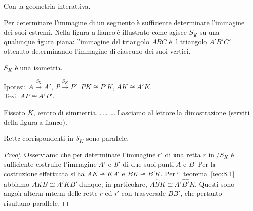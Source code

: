Con la geometria interattiva.


\noindent\begin{minipage}{0.65\textwidth}\parindent15pt
Per determinare l'immagine di un segmento è sufficiente determinare 
l'immagine dei suoi estremi. Nella figura a fianco è illustrato come 
agisce \(S_K\) su una qualunque figura piana: l'immagine del triangolo 
\(ABC\) è il triangolo \(A'B'C'\) ottenuto determinando l'immagine di 
ciascuno dei suoi vertici.
\end{minipage}\hfil
\begin{minipage}{0.35\textwidth}
  \centering
\end{minipage}

\begin{teorema}\label{teo:8.1}
\(S_K\) è una isometria.
\end{teorema}

\noindent\begin{minipage}{0.65\textwidth}\parindent15pt
\noindent Ipotesi: \(A\overset{S_K}{\rightarrow}A'\), 
\(P\overset{S_K}{\rightarrow}P'\), \(PK\cong P'K\), \(AK\cong A'K\).\\
Tesi: \(AP\cong A'P'\).

Fissato \(K\), centro di simmetria, \ldots\ldots\ldots{}.
Lasciamo al lettore la dimostrazione (serviti della figura a fianco).
\end{minipage}\hfil
\begin{minipage}{0.35\textwidth}
  \centering
\end{minipage}

\begin{teorema}\label{teo:8.2}
Rette corrispondenti in \(S_K\) sono parallele.
\end{teorema}

\noindent\begin{minipage}{0.65\textwidth}\parindent15pt
\begin{proof}
Osserviamo che per determinare l'immagine \(r'\) di una retta \(r\) in 
/\(S_K\) è sufficiente costruire l'immagine \(A'\) e \(B'\) di due suoi 
punti \(A\) e \(B\). Per la costruzione effettuata si ha \(AK\cong KA'\) e 
\(BK\cong B'K\). Per il teorema~\ref{teo:8.1} abbiamo \(AKB\cong A'KB'\) 
dunque, in particolare, \(A\widehat{B}K\cong A'\widehat{B'}K\). Questi 
sono angoli alterni interni delle rette \(r\) ed \(r'\) con trasversale 
\(BB'\), che pertanto risultano parallele.
\end{proof}
\end{minipage}\hfil
\begin{minipage}{0.35\textwidth}
  
\centering
\end{minipage}\vspace{8pt}

